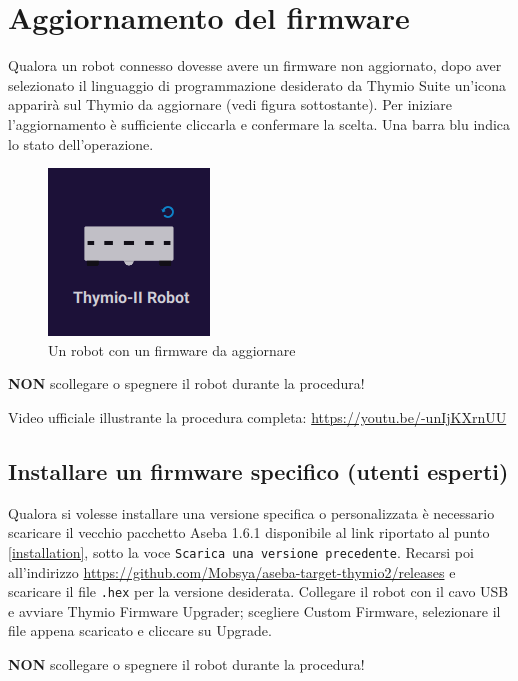 \documentclass[12pt]{article}
\begin{document}
		
\section{Aggiornamento del firmware}
	
	Qualora un robot connesso dovesse avere un firmware non aggiornato, dopo aver selezionato il linguaggio di programmazione desiderato da Thymio Suite un'icona apparirà sul Thymio da aggiornare (vedi figura sottostante). Per iniziare l'aggiornamento è sufficiente cliccarla e confermare la scelta. Una barra blu indica lo stato dell'operazione.
	
	\begin{figure}[H]
		\centering
		\includegraphics{img/fwUpgrade.png}
		\caption{Un robot con un firmware da aggiornare}
		\label{fwUpgrade}
	\end{figure}
	
	\textbf{NON} scollegare o spegnere il robot durante la procedura!
	
	Video ufficiale illustrante la procedura completa: \url{https://youtu.be/-unIjKXrnUU}\\
	
	
	\subsection{Installare un firmware specifico (utenti esperti)}
	
	Qualora si volesse installare una versione specifica o personalizzata è necessario scaricare il vecchio pacchetto Aseba 1.6.1 disponibile al link riportato al punto \ref{installation}, sotto la voce \texttt{Scarica una versione precedente}.	
	Recarsi poi all'indirizzo \url{https://github.com/Mobsya/aseba-target-thymio2/releases} e scaricare il file \texttt{.hex} per la versione desiderata. Collegare il robot con il cavo USB e avviare Thymio Firmware Upgrader; scegliere Custom Firmware, selezionare il file appena scaricato e cliccare su Upgrade. 
	
	\textbf{NON} scollegare o spegnere il robot durante la procedura!
	
\end{document}
